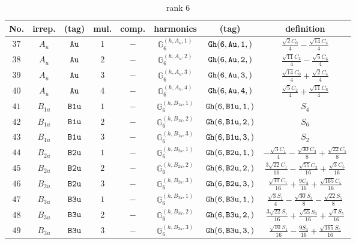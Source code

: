 \documentclass[fleqn,8pt]{jsarticle}
\begin{document}
\begin{table}[ht!]
\begin{center}
\caption{rank 6}
\renewcommand{\arraystretch}{1.3}
\begin{tabular}{cccccccc} \hline \hline
No. & irrep. & (tag) & mul. & comp. & harmonics & (tag) & definition \\ \hline
$ 37 $ & $ A_{u} $ & $ {\tt Au} $ & $ 1 $ & $ - $ & $ \mathbb{G}_{6}^{(h,A_{u},1)} $ & $ {\tt Gh(6,Au,1,)} $ & $ \frac{\sqrt{2} C_{0}}{4} - \frac{\sqrt{14} C_{4}}{4} $ \\
$ 38 $ & $ A_{u} $ & $ {\tt Au} $ & $ 2 $ & $ - $ & $ \mathbb{G}_{6}^{(h,A_{u},2)} $ & $ {\tt Gh(6,Au,2,)} $ & $ \frac{\sqrt{11} C_{2}}{4} - \frac{\sqrt{5} C_{6}}{4} $ \\
$ 39 $ & $ A_{u} $ & $ {\tt Au} $ & $ 3 $ & $ - $ & $ \mathbb{G}_{6}^{(h,A_{u},3)} $ & $ {\tt Gh(6,Au,3,)} $ & $ \frac{\sqrt{14} C_{0}}{4} + \frac{\sqrt{2} C_{4}}{4} $ \\
$ 40 $ & $ A_{u} $ & $ {\tt Au} $ & $ 4 $ & $ - $ & $ \mathbb{G}_{6}^{(h,A_{u},4)} $ & $ {\tt Gh(6,Au,4,)} $ & $ \frac{\sqrt{5} C_{2}}{4} + \frac{\sqrt{11} C_{6}}{4} $ \\
$ 41 $ & $ B_{1u} $ & $ {\tt B1u} $ & $ 1 $ & $ - $ & $ \mathbb{G}_{6}^{(h,B_{1u},1)} $ & $ {\tt Gh(6,B1u,1,)} $ & $ S_{4} $ \\
$ 42 $ & $ B_{1u} $ & $ {\tt B1u} $ & $ 2 $ & $ - $ & $ \mathbb{G}_{6}^{(h,B_{1u},2)} $ & $ {\tt Gh(6,B1u,2,)} $ & $ S_{6} $ \\
$ 43 $ & $ B_{1u} $ & $ {\tt B1u} $ & $ 3 $ & $ - $ & $ \mathbb{G}_{6}^{(h,B_{1u},3)} $ & $ {\tt Gh(6,B1u,3,)} $ & $ S_{2} $ \\
$ 44 $ & $ B_{2u} $ & $ {\tt B2u} $ & $ 1 $ & $ - $ & $ \mathbb{G}_{6}^{(h,B_{2u},1)} $ & $ {\tt Gh(6,B2u,1,)} $ & $ - \frac{\sqrt{3} C_{1}}{4} - \frac{\sqrt{30} C_{3}}{8} + \frac{\sqrt{22} C_{5}}{8} $ \\
$ 45 $ & $ B_{2u} $ & $ {\tt B2u} $ & $ 2 $ & $ - $ & $ \mathbb{G}_{6}^{(h,B_{2u},2)} $ & $ {\tt Gh(6,B2u,2,)} $ & $ \frac{3 \sqrt{22} C_{1}}{16} - \frac{\sqrt{55} C_{3}}{16} + \frac{\sqrt{3} C_{5}}{16} $ \\
$ 46 $ & $ B_{2u} $ & $ {\tt B2u} $ & $ 3 $ & $ - $ & $ \mathbb{G}_{6}^{(h,B_{2u},3)} $ & $ {\tt Gh(6,B2u,3,)} $ & $ \frac{\sqrt{10} C_{1}}{16} + \frac{9 C_{3}}{16} + \frac{\sqrt{165} C_{5}}{16} $ \\
$ 47 $ & $ B_{3u} $ & $ {\tt B3u} $ & $ 1 $ & $ - $ & $ \mathbb{G}_{6}^{(h,B_{3u},1)} $ & $ {\tt Gh(6,B3u,1,)} $ & $ \frac{\sqrt{3} S_{1}}{4} - \frac{\sqrt{30} S_{3}}{8} - \frac{\sqrt{22} S_{5}}{8} $ \\
$ 48 $ & $ B_{3u} $ & $ {\tt B3u} $ & $ 2 $ & $ - $ & $ \mathbb{G}_{6}^{(h,B_{3u},2)} $ & $ {\tt Gh(6,B3u,2,)} $ & $ \frac{3 \sqrt{22} S_{1}}{16} + \frac{\sqrt{55} S_{3}}{16} + \frac{\sqrt{3} S_{5}}{16} $ \\
$ 49 $ & $ B_{3u} $ & $ {\tt B3u} $ & $ 3 $ & $ - $ & $ \mathbb{G}_{6}^{(h,B_{3u},3)} $ & $ {\tt Gh(6,B3u,3,)} $ & $ \frac{\sqrt{10} S_{1}}{16} - \frac{9 S_{3}}{16} + \frac{\sqrt{165} S_{5}}{16} $ \\
 \hline \hline
\end{tabular}
\end{center}
\end{table}
\end{document}
